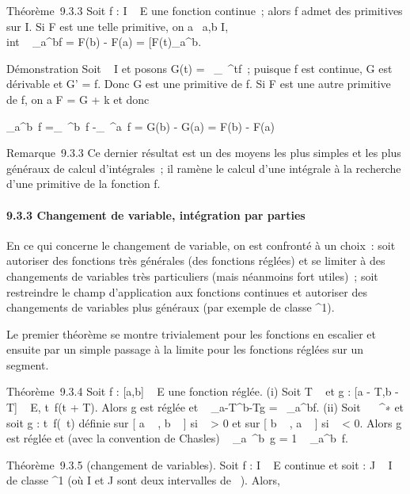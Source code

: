 \documentclass[]{article}
\begin{document}
Théorème~9.3.3 Soit f : I \rightarrow~ E une fonction continue~; alors f admet des
primitives sur I. Si F est une telle primitive, on a
\forall~a,b \in I, \\int ~
\_a^bf = F(b) - F(a) = \left
{[}F(t)\right {]}\_a^b.

Démonstration Soit \alpha~ \in I et posons G(t) =\int ~
\_\alpha~^tf~; puisque f est continue, G est dérivable et G' = f.
Donc G est une primitive de f. Si F est une autre primitive de f, on a F
= G + k et donc

\int  \_a^b~f
=\int  \_\alpha~^b~f
-\int  \_\alpha~^a~f = G(b) - G(a) = F(b)
- F(a)

Remarque~9.3.3 Ce dernier résultat est un des moyens les plus simples et
les plus généraux de calcul d'intégrales~; il ramène le calcul d'une
intégrale à la recherche d'une primitive de la fonction f.

\paragraph{9.3.3 Changement de variable, intégration par parties}

En ce qui concerne le changement de variable, on est confronté à un
choix~: soit autoriser des fonctions très générales (des fonctions
réglées) et se limiter à des changements de variables très particuliers
(mais néanmoins fort utiles)~; soit restreindre le champ d'application
aux fonctions continues et autoriser des changements de variables plus
généraux (par exemple de classe ^1).

Le premier théorème se montre trivialement pour les fonctions en
escalier et ensuite par un simple passage à la limite pour les fonctions
réglées sur un segment.

Théorème~9.3.4 Soit f : {[}a,b{]} \rightarrow~ E une fonction réglée. (i) Soit T \in
{}~ et g : {[}a - T,b - T{]} \rightarrow~ E, t\mapsto~f(t + T).
Alors g est réglée et \int ~
\_a-T^b-Tg =\int ~
\_a^bf. (ii) Soit \lambda~ \in {}~^∗ et soit g :
t\mapsto~f(\lambda~t) définie sur {[} a
\over \lambda~ , b \over \lambda~ {]} si \lambda~
\textgreater{} 0 et sur {[} b \over \lambda~ , a
\over \lambda~ {]} si \lambda~ \textless{} 0. Alors g est réglée et
(avec la convention de Chasles) \int ~
\_a\diagup\lambda~^b\diagup\lambda~g = 1 \over \lambda~
\int  \_a^b~f.

Théorème~9.3.5 (changement de variables). Soit f : I \rightarrow~ E continue et
soit \phi : J \rightarrow~ I de classe ^1 (où I et J sont deux intervalles
de ~). Alors,
\end{document}
